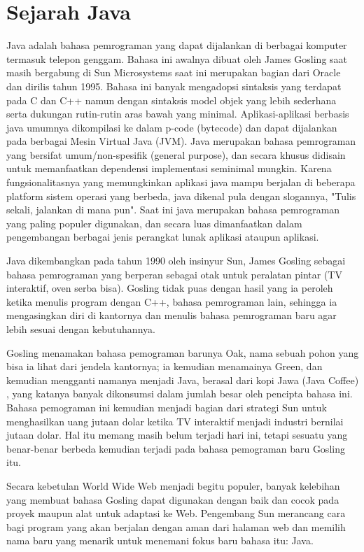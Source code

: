 \section{Sejarah Java}
Java adalah bahasa pemrograman yang dapat dijalankan di berbagai komputer termasuk telepon genggam. Bahasa ini awalnya dibuat oleh James Gosling saat masih bergabung di Sun Microsystems saat ini merupakan bagian dari Oracle dan dirilis tahun 1995. Bahasa ini banyak mengadopsi sintaksis yang terdapat pada C dan C++ namun dengan sintaksis model objek yang lebih sederhana serta dukungan rutin-rutin aras bawah yang minimal. Aplikasi-aplikasi berbasis java umumnya dikompilasi ke dalam p-code (bytecode) dan dapat dijalankan pada berbagai Mesin Virtual Java (JVM). Java merupakan bahasa pemrograman yang bersifat umum/non-spesifik (general purpose), dan secara khusus didisain untuk memanfaatkan dependensi implementasi seminimal mungkin. Karena fungsionalitasnya yang memungkinkan aplikasi java mampu berjalan di beberapa platform sistem operasi yang berbeda, java dikenal pula dengan slogannya, "Tulis sekali, jalankan di mana pun". Saat ini java merupakan bahasa pemrograman yang paling populer digunakan, dan secara luas dimanfaatkan dalam pengembangan berbagai jenis perangkat lunak aplikasi ataupun aplikasi. 

Java dikembangkan pada tahun 1990 oleh insinyur Sun, James Gosling sebagai bahasa pemrograman yang  berperan sebagai otak untuk peralatan pintar (TV interaktif, oven serba bisa). Gosling tidak puas dengan hasil yang ia peroleh ketika menulis program dengan C++, bahasa pemrograman lain, sehingga ia mengasingkan diri di kantornya dan menulis bahasa pemrograman baru agar lebih sesuai dengan kebutuhannya.

Gosling menamakan bahasa pemograman barunya Oak, nama sebuah pohon yang bisa ia lihat dari jendela kantornya; ia kemudian menamainya Green, dan kemudian mengganti namanya menjadi Java, berasal dari kopi Jawa (Java Coffee) , yang katanya banyak dikonsumsi dalam jumlah besar oleh pencipta bahasa ini. Bahasa pemograman ini kemudian menjadi bagian dari strategi Sun untuk menghasilkan uang jutaan dolar ketika TV interaktif menjadi industri bernilai jutaan dolar. Hal itu memang masih belum terjadi hari ini, tetapi sesuatu yang benar-benar berbeda kemudian terjadi pada bahasa pemograman baru Gosling itu.

Secara kebetulan World Wide Web menjadi begitu populer, banyak kelebihan yang membuat bahasa Gosling dapat digunakan dengan baik dan cocok pada proyek maupun alat untuk adaptasi ke Web. Pengembang Sun merancang cara bagi program yang akan berjalan dengan aman dari halaman web dan memilih nama baru yang menarik untuk menemani fokus baru bahasa itu: Java.

